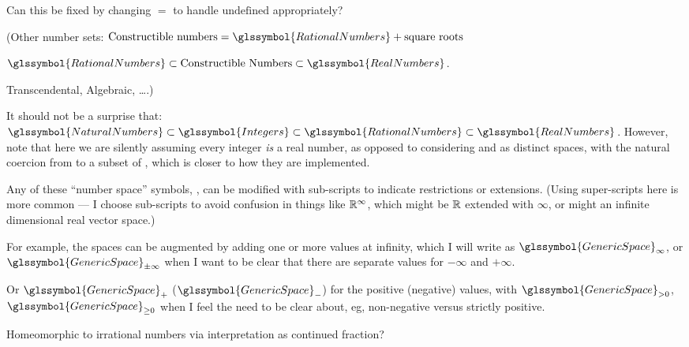 Can this be fixed by changing $=$ to handle $\text{undefined}$
appropriately?


(Other number sets:
$\text{Constructible numbers} = \glssymbol{RationalNumbers}
+ \text{square roots}$

$\glssymbol{RationalNumbers}
\subset 
\text{Constructible Numbers}
\subset 
\glssymbol{RealNumbers}$.

Transcendental, Algebraic, \ldots.)

It should not be a surprise that:
$\glssymbol{NaturalNumbers} 
\subset 
\glssymbol{Integers}
\subset 
\glssymbol{RationalNumbers}
\subset 
\glssymbol{RealNumbers}$.
However, note that here we are silently assuming every integer
\emph{is} a real number, as opposed to considering  and
 as distinct spaces, with the natural coercion
from  to a subset of ,
which is closer to how they are implemented.

Any of these ``number space'' symbols, ,
can be modified with sub-scripts to indicate restrictions or
extensions. 
(Using super-scripts here is more common --- I choose sub-scripts
to avoid confusion in things like $\mathbb{R}^{\infty}$,
which might be $\mathbb{R}$ extended with ${\infty}$, 
or might an infinite dimensional real vector space.)

For example, the spaces can be 
augmented by adding one or more values at infinity, which I will
write as $\glssymbol{GenericSpace}_{\infty}$,
or $\glssymbol{GenericSpace}_{\pm\infty}$ when I want to be 
clear that there are separate values for $-\infty$ and $+\infty$.

Or $\glssymbol{GenericSpace}_{+}$ ($\glssymbol{GenericSpace}_{-}$)
for the positive (negative) values, with 
$\glssymbol{GenericSpace}_{> 0}$, $\glssymbol{GenericSpace}_{\geq 0}$ 
when I feel the need to be clear about, eg, non-negative versus
strictly positive.

\label{sec:Baire-space}

Homeomorphic to irrational numbers
via interpretation as 
continued 
fraction?\cite{wiki:BaireSpaceSetTheory,
wiki:BaireCategoryTheorem,wiki:BaireSpace}



